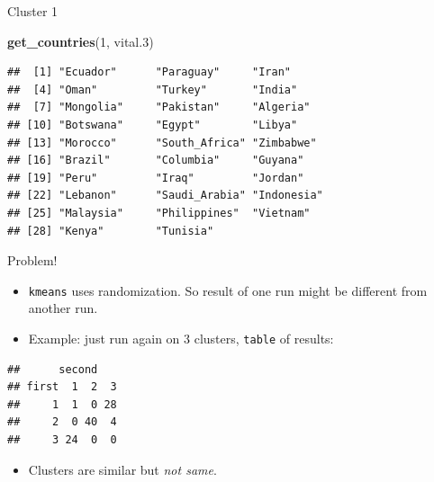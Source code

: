 \documentclass[ignorenonframetext,]{beamer}
\newenvironment{Shaded}{\begin{snugshade}}{\end{snugshade}}
\newcommand{\DataTypeTok}[1]{\textcolor[rgb]{0.13,0.29,0.53}{#1}}
\newcommand{\DecValTok}[1]{\textcolor[rgb]{0.00,0.00,0.81}{#1}}
\newcommand{\FloatTok}[1]{\textcolor[rgb]{0.00,0.00,0.81}{#1}}
\newcommand{\KeywordTok}[1]{\textcolor[rgb]{0.13,0.29,0.53}{\textbf{#1}}}
\newcommand{\NormalTok}[1]{#1}
\newcommand{\OperatorTok}[1]{\textcolor[rgb]{0.81,0.36,0.00}{\textbf{#1}}}
\newcommand{\StringTok}[1]{\textcolor[rgb]{0.31,0.60,0.02}{#1}}
\providecommand{\tightlist}{%
  \setlength{\itemsep}{0pt}\setlength{\parskip}{0pt}}
\begin{document}
\begin{frame}[fragile]{Cluster 1}
\protect\hypertarget{cluster-1}{}

\begin{Shaded}
\begin{Highlighting}[]
\KeywordTok{get_countries}\NormalTok{(}\DecValTok{1}\NormalTok{, vital}\FloatTok{.3}\NormalTok{)}
\end{Highlighting}
\end{Shaded}

\begin{verbatim}
##  [1] "Ecuador"      "Paraguay"     "Iran"        
##  [4] "Oman"         "Turkey"       "India"       
##  [7] "Mongolia"     "Pakistan"     "Algeria"     
## [10] "Botswana"     "Egypt"        "Libya"       
## [13] "Morocco"      "South_Africa" "Zimbabwe"    
## [16] "Brazil"       "Columbia"     "Guyana"      
## [19] "Peru"         "Iraq"         "Jordan"      
## [22] "Lebanon"      "Saudi_Arabia" "Indonesia"   
## [25] "Malaysia"     "Philippines"  "Vietnam"     
## [28] "Kenya"        "Tunisia"
\end{verbatim}

\end{frame}

\begin{frame}[fragile]{Problem!}
\protect\hypertarget{problem}{}

\begin{itemize}
\item
  \texttt{kmeans} uses randomization. So result of one run might be
  different from another run.
\item
  Example: just run again on 3 clusters, \texttt{table} of results:
\end{itemize}

\small

\begin{Shaded}
\end{Shaded}

\begin{verbatim}
##      second
## first  1  2  3
##     1  1  0 28
##     2  0 40  4
##     3 24  0  0
\end{verbatim}

\normalsize

\begin{itemize}
\tightlist
\item
  Clusters are similar but \emph{not same}.
\end{itemize}

\end{frame}
\end{document}
